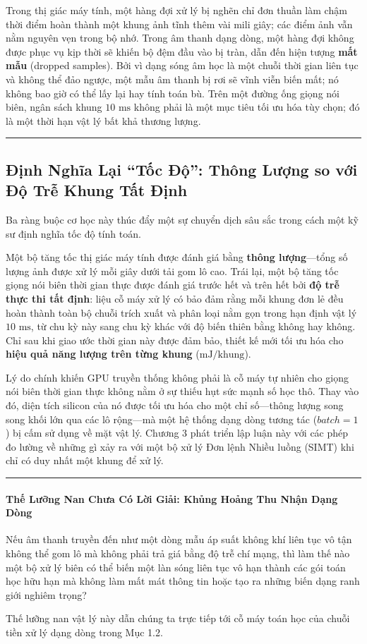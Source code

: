 \documentclass[11pt,a4paper]{article}
\begin{document}
Trong thị giác máy tính, một hàng đợi xử lý bị nghẽn chỉ đơn thuần làm chậm thời điểm hoàn thành một khung ảnh tĩnh thêm vài mili giây; các điểm ảnh vẫn nằm nguyên vẹn trong bộ nhớ. Trong âm thanh dạng dòng, một hàng đợi không được phục vụ kịp thời sẽ khiến bộ đệm đầu vào bị tràn, dẫn đến hiện tượng \textbf{mất mẫu} (dropped samples). Bởi vì dạng sóng âm học là một chuỗi thời gian liên tục và không thể đảo ngược, một mẫu âm thanh bị rơi sẽ vĩnh viễn biến mất; nó không bao giờ có thể lấy lại hay tính toán bù. Trên một đường ống giọng nói biên, ngân sách khung $10\text{ ms}$ không phải là một mục tiêu tối ưu hóa tùy chọn; đó là một thời hạn vật lý bất khả thương lượng.

\medskip
\hrule
\medskip

\subsection*{Định Nghĩa Lại ``Tốc Độ'': Thông Lượng so với Độ Trễ Khung Tất Định}

Ba ràng buộc cơ học này thúc đẩy một sự chuyển dịch sâu sắc trong cách một kỹ sư định nghĩa tốc độ tính toán.

Một bộ tăng tốc thị giác máy tính được đánh giá bằng \textbf{thông lượng}---tổng số lượng ảnh được xử lý mỗi giây dưới tải gom lô cao. Trái lại, một bộ tăng tốc giọng nói biên thời gian thực được đánh giá trước hết và trên hết bởi \textbf{độ trễ thực thi tất định}: liệu cỗ máy xử lý có bảo đảm rằng mỗi khung đơn lẻ đều hoàn thành toàn bộ chuỗi trích xuất và phân loại nằm gọn trong hạn định vật lý $10\text{ ms}$, từ chu kỳ này sang chu kỳ khác với độ biến thiên bằng không hay không. Chỉ sau khi giao ước thời gian này được đảm bảo, thiết kế mới tối ưu hóa cho \textbf{hiệu quả năng lượng trên từng khung} ($\text{mJ/khung}$).

Lý do chính khiến GPU truyền thống không phải là cỗ máy tự nhiên cho giọng nói biên thời gian thực không nằm ở sự thiếu hụt sức mạnh số học thô. Thay vào đó, diện tích silicon của nó được tối ưu hóa cho một chỉ số---thông lượng song song khối lớn qua các lô rộng---mà một hệ thống dạng dòng tương tác ($batch = 1$) bị cấm sử dụng về mặt vật lý. Chương 3 phát triển lập luận này với các phép đo lường về những gì xảy ra với một bộ xử lý Đơn lệnh Nhiều luồng (SIMT) khi chỉ có duy nhất một khung để xử lý.

\medskip
\hrule
\medskip

\paragraph{Thế Lưỡng Nan Chưa Có Lời Giải: Khủng Hoảng Thu Nhận Dạng Dòng}
Nếu âm thanh truyền đến như một dòng mẫu áp suất không khí liên tục vô tận không thể gom lô mà không phải trả giá bằng độ trễ chí mạng, thì làm thế nào một bộ xử lý biên có thể biến một làn sóng liên tục vô hạn thành các gói toán học hữu hạn mà không làm mất mát thông tin hoặc tạo ra những biến dạng ranh giới nghiêm trọng?

Thế lưỡng nan vật lý này dẫn chúng ta trực tiếp tới cỗ máy toán học của chuỗi tiền xử lý dạng dòng trong Mục 1.2.
\end{document}
